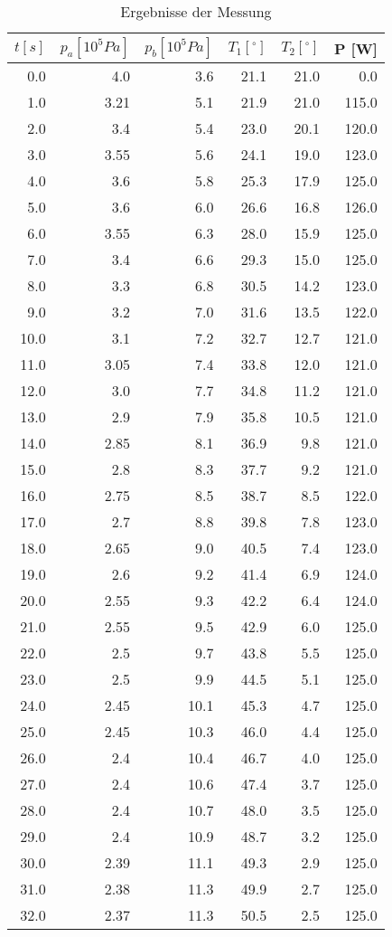 \documentclass[11pt]{article}
\begin{document}
\begin{table}
\begin{tabular}{r|r|r|r|r|r}
$t [s]$ & $p_a [10^5Pa]$ & $p_b [10^5Pa]$ & $T_1 [^\circ]$ & $T_2 [^\circ]$ & P [W] \\
\hline
0.0 & 4.0 & 3.6 & 21.1 & 21.0 & 0.0\\
1.0 & 3.21 & 5.1 & 21.9 & 21.0 & 115.0\\
2.0 & 3.4 & 5.4 & 23.0 & 20.1 & 120.0\\
3.0 & 3.55 & 5.6 & 24.1 & 19.0 & 123.0\\
4.0 & 3.6 & 5.8 & 25.3 & 17.9 & 125.0\\
5.0 & 3.6 & 6.0 & 26.6 & 16.8 & 126.0\\
6.0 & 3.55 & 6.3 & 28.0 & 15.9 & 125.0\\
7.0 & 3.4 & 6.6 & 29.3 & 15.0 & 125.0\\
8.0 & 3.3 & 6.8 & 30.5 & 14.2 & 123.0\\
9.0 & 3.2 & 7.0 & 31.6 & 13.5 & 122.0\\
10.0 & 3.1 & 7.2 & 32.7 & 12.7 & 121.0\\
11.0 & 3.05 & 7.4 & 33.8 & 12.0 & 121.0\\
12.0 & 3.0 & 7.7 & 34.8 & 11.2 & 121.0\\
13.0 & 2.9 & 7.9 & 35.8 & 10.5 & 121.0\\
14.0 & 2.85 & 8.1 & 36.9 & 9.8 & 121.0\\
15.0 & 2.8 & 8.3 & 37.7 & 9.2 & 121.0\\
16.0 & 2.75 & 8.5 & 38.7 & 8.5 & 122.0\\
17.0 & 2.7 & 8.8 & 39.8 & 7.8 & 123.0\\
18.0 & 2.65 & 9.0 & 40.5 & 7.4 & 123.0\\
19.0 & 2.6 & 9.2 & 41.4 & 6.9 & 124.0\\
20.0 & 2.55 & 9.3 & 42.2 & 6.4 & 124.0\\
21.0 & 2.55 & 9.5 & 42.9 & 6.0 & 125.0\\
22.0 & 2.5 & 9.7 & 43.8 & 5.5 & 125.0\\
23.0 & 2.5 & 9.9 & 44.5 & 5.1 & 125.0\\
24.0 & 2.45 & 10.1 & 45.3 & 4.7 & 125.0\\
25.0 & 2.45 & 10.3 & 46.0 & 4.4 & 125.0\\
26.0 & 2.4 & 10.4 & 46.7 & 4.0 & 125.0\\
27.0 & 2.4 & 10.6 & 47.4 & 3.7 & 125.0\\
28.0 & 2.4 & 10.7 & 48.0 & 3.5 & 125.0\\
29.0 & 2.4 & 10.9 & 48.7 & 3.2 & 125.0\\
30.0 & 2.39 & 11.1 & 49.3 & 2.9 & 125.0\\
31.0 & 2.38 & 11.3 & 49.9 & 2.7 & 125.0\\
32.0 & 2.37 & 11.3 & 50.5 & 2.5 & 125.0\\
\end{tabular}
\centering
\caption{Ergebnisse der Messung}
\label{data}
\end{table}
\end{document}
